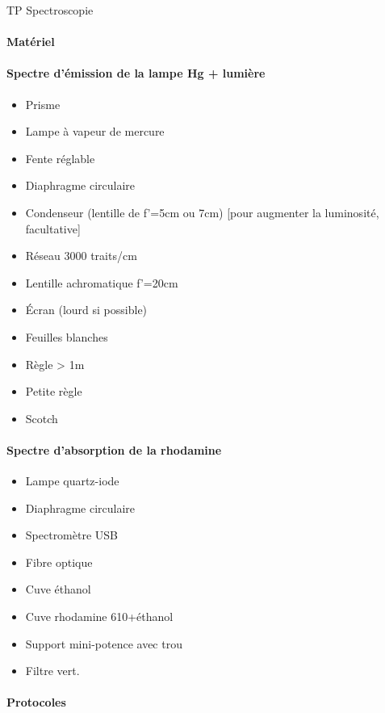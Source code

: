 \documentclass[11pt]{report}
\numberwithin{figure}{section}
\numberwithin{equation}{section}
\numberwithin{table}{section}
\newcommand{\1}{\boldsymbol{1}}
\begin{document}
\textcolor{mycolor5}{TP Spectroscopie}

\begin{tcolorbox}[breakable, enhanced, colback=red!2!white,colframe=mycolor!85!black,title=\textbf{\textbf{Expérience}}]
\paragraph*{Matériel}
\paragraph{Spectre d'émission de la lampe Hg + lumière}
\begin{itemize}
\item Prisme
\item Lampe à vapeur de mercure
\item Fente réglable
\item Diaphragme circulaire
\item Condenseur (lentille de f'=5cm ou 7cm) [pour augmenter la luminosité, facultative]
\item Réseau 3000 traits/cm
\item Lentille achromatique f'=20cm
\item Écran (lourd si possible)
\item Feuilles blanches 
\item Règle > 1m
\item Petite règle
\item Scotch
\end{itemize}

\paragraph{Spectre d'absorption de la rhodamine}
\begin{itemize}
\item Lampe quartz-iode
\item Diaphragme circulaire
\item Spectromètre USB
\item Fibre optique
\item Cuve éthanol
\item Cuve rhodamine 610+éthanol
\item Support mini-potence avec trou
\item Filtre vert.
\end{itemize}

\paragraph{Protocoles} 


\end{tcolorbox}
\end{document}
